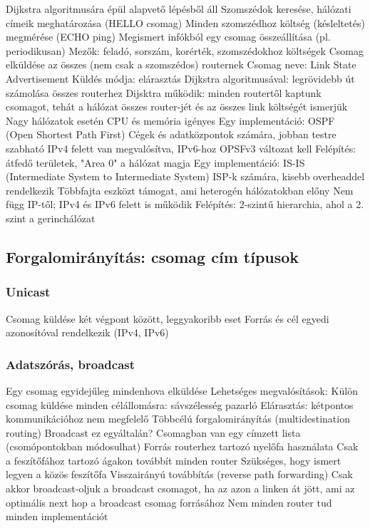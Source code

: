 \documentclass[12pt,a4paper]{article}
\begin{document}
\begin{outline}
	\1 Dijkstra algoritmusára épül
	 alapvető lépésből áll
		\2 Szomszédok keresése, hálózati címeik meghatározása (HELLO csomag)
		\2 Minden szomszédhoz költség (késleltetés) megmérése (ECHO ping)
		\2 Megismert infókból egy csomag összeállítása (pl. periodikusan)
			\3 Mezők: feladó, sorszám, korérték, szomszédokhoz költségek
		\2 Csomag elküldése az összes (nem csak a szomszédos) routernek
			\3 Csomag neve: Link State Advertisement
			\3 Küldés módja: elárasztás
		\2 Dijkstra algoritmusával: legrövidebb út számolása összes routerhez
			\3 Dijsktra működik: minden routertől kaptunk csomagot, tehát a hálózat összes router-jét és az összes link költségét ismerjük
	\1 Nagy hálózatok esetén CPU és memória igényes
	\1 Egy implementáció: OSPF (Open Shortest Path First)
		\2 Cégek és adatközpontok számára, jobban testre szabható
		\2 IPv4 felett van megvalósítva, IPv6-hoz OPSFv3 változat kell
		\2 Felépítés: átfedő területek, "Area 0" a hálózat magja
	\1 Egy implementáció: IS-IS (Intermediate System to Intermediate System)
		\2 ISP-k számára, kisebb overheaddel rendelkezik
		\2 Többfajta eszközt támogat, ami heterogén hálózatokban előny
		\2 Nem függ IP-től; IPv4 és IPv6 felett is működik
		\2 Felépítés: 2-szintű hierarchia, ahol a 2. szint a gerinchálózat
\end{outline}

\pagebreak

\subsection{Forgalomirányítás: csomag cím típusok}

\subsubsection{Unicast}

\begin{outline}
	\1 Csomag küldése két végpont között, leggyakoribb eset
	\1 Forrás és cél egyedi azonosítóval rendelkezik (IPv4, IPv6)
\end{outline}

\subsubsection{Adatszórás, broadcast}

\begin{outline}
	\1 Egy csomag egyidejűleg mindenhova elküldése
	\1 Lehetséges megvalósítások:
		\2 Külön csomag küldése minden célállomásra: sávszélesség pazarló
		\2 Elárasztás: kétpontos kommunikációhoz nem megfelelő
		\2 Többcélú forgalomirányítás (multidestination routing)
			\3 Broadcast ez egyáltalán?
			\3 Csomagban van egy címzett lista (csomópontokban módosulhat)
		\2 Forrás routerhez tartozó nyelőfa használata
			\3 Csak a feszítőfához tartozó ágakon továbbít minden router
			\3 Szükséges, hogy ismert legyen a közös feszítőfa
		\2 Visszairányú továbbítás (reverse path forwarding)
			\3 Csak akkor broadcast-oljuk a broadcast csomagot, ha az azon a linken át jött, ami az optimális next hop a broadcast csomag forrásához
	\1 Nem minden router tud minden implementációt
\end{outline}
\end{document}
